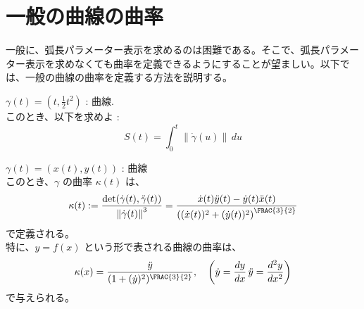 \documentclass[article,paper=a4paper]{jlreq}
\begin{document}

\section{一般の曲線の曲率}
    一般に、弧長パラメーター表示を求めるのは困難である。そこで、弧長パラメーター表示を求めなくても曲率を定義できるようにすることが望ましい。以下では、一般の曲線の曲率を定義する方法を説明する。

\begin{prob}
    \quad $\gamma(t) = \left(t, \frac{1}{2}t^2\right)$ : 曲線.\\
    このとき、以下を求めよ :
    \[S(t) = \int_0^t\left\lVert \dot{\gamma}(u)\right\rVert \, du \]
\end{prob}

\begin{thm}
    \quad $\gamma(t)=(x(t), y(t))$ : 曲線\\
    このとき、$\gamma$ の曲率 $\kappa(t)$ は、
\[\kappa(t) := \frac{\det(\dot{\gamma}(t), \ddot{\gamma}(t))}{\left\|\dot{\gamma}(t)\right\|^3} = \frac{\dot{x}(t)\ddot{y}(t) - \dot{y}(t)\ddot{x}(t)}{\left((\dot{x}(t))^2 + (\dot{y}(t))^2\right)^{\FRAC{3}{2}}}\]
で定義される。\\
    特に、$y = f(x)$ という形で表される曲線の曲率は、
    \[\kappa(x) = \frac{\ddot{y}}{(1 + (\dot{y})^2)^{\FRAC{3}{2}}}, \quad \left(\dot{y} = \frac{dy}{dx}\, \ddot{y} = \frac{d^2y}{dx^2}\right)\]
    で与えられる。
\end{thm}
\end{document}
